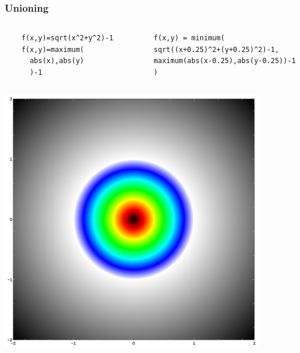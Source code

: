 \documentclass{beamer}
\begin{document}
\begin{frame}[fragile]
\frametitle{Unioning}
\begin{columns}
  \begin{column}{0.33\textwidth}
  \lstset{basicstyle=\ttfamily\scriptsize}
    \begin{lstlisting}
    f(x,y)=sqrt(x^2+y^2)-1
    f(x,y)=maximum(
      abs(x),abs(y)
      )-1
    \end{lstlisting}
  \end{column}
  \begin{column}{0.60\textwidth}
  \lstset{basicstyle=\ttfamily\scriptsize}
    \begin{lstlisting}
      f(x,y) = minimum(
      sqrt((x+0.25)^2+(y+0.25)^2)-1,
      maximum(abs(x-0.25),abs(y-0.25))-1
      )
    \end{lstlisting}
  \end{column}
\end{columns}
\begin{columns}
  \begin{column}{0.33\textwidth}
    \includegraphics[width=0.9\textwidth, left]{implicit_circle.jpg}
  \end{column}
  \begin{column}{0.33\textwidth}

\end{column}
\end{columns}
\end{frame}
\end{document}
